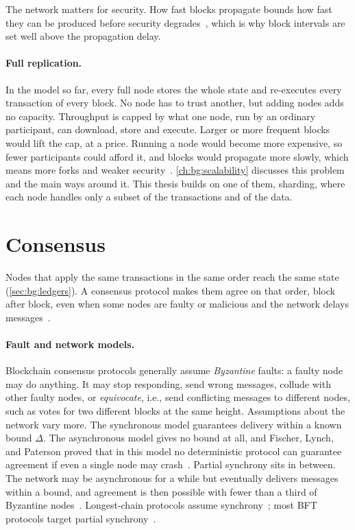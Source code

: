 The network matters for security.
How fast blocks propagate bounds how fast they can be produced before security degrades~\cite{garay2015backbone,gervais2016security}, which is why block intervals are set well above the propagation delay.

\paragraph{Full replication.}
In the model so far, every full node stores the whole state and re-executes every transaction of every block.
No node has to trust another, but adding nodes adds no capacity.
Throughput is capped by what one node, run by an ordinary participant, can download, store and execute.
Larger or more frequent blocks would lift the cap, at a price.
Running a node would become more expensive, so fewer participants could afford it, and blocks would propagate more slowly, which means more forks and weaker security~\cite{gervais2016security}.
\autoref{ch:bg:scalability} discusses this problem and the main ways around it.
This thesis builds on one of them, sharding, where each node handles only a subset of the transactions and of the data.

\section{Consensus}\label{sec:bg:consensus}

Nodes that apply the same transactions in the same order reach the same state (\autoref{sec:bg:ledgers}).
A consensus protocol makes them agree on that order, block after block, even when some nodes are faulty or malicious and the network delays messages~\cite{lamport1982byzantine}.

\paragraph{Fault and network models.}
Blockchain consensus protocols generally assume \emph{Byzantine} faults: a faulty node may do anything.
It may stop responding, send wrong messages, collude with other faulty nodes, or \emph{equivocate}, i.e., send conflicting messages to different nodes, such as votes for two different blocks at the same height.
Assumptions about the network vary more.
The synchronous model guarantees delivery within a known bound $\Delta$.
The asynchronous model gives no bound at all, and Fischer, Lynch, and Paterson proved that in this model no deterministic protocol can guarantee agreement if even a single node may crash~\cite{fischer1985impossibility}.
Partial synchrony sits in between.
The network may be asynchronous for a while but eventually delivers messages within a bound, and agreement is then possible with fewer than a third of Byzantine nodes~\cite{dwork1988partial}.
Longest-chain protocols assume synchrony~\cite{garay2015backbone}; most BFT protocols target partial synchrony~\cite{castro1999pbft,yin2019hotstuff}.

